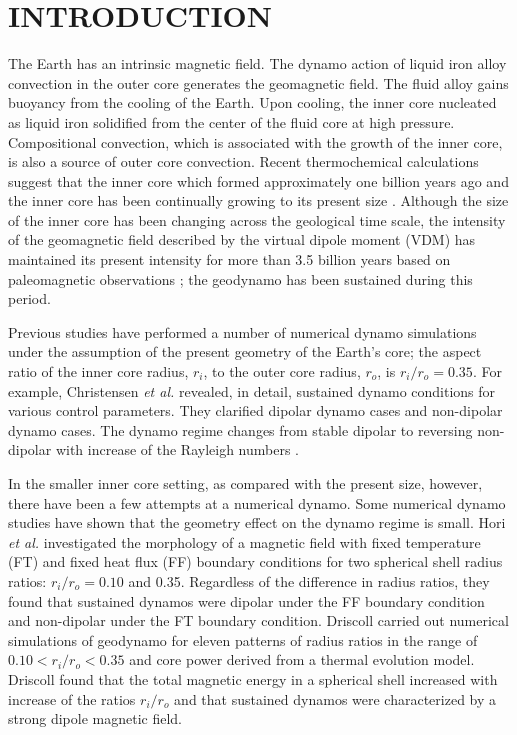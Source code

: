 \section{INTRODUCTION}
The Earth has an intrinsic magnetic field. The dynamo action of liquid iron alloy convection in the outer core generates the geomagnetic field. The fluid alloy gains buoyancy from the cooling of the Earth. Upon cooling, the inner core nucleated as liquid iron solidified from the center of the fluid core at high pressure. Compositional convection, which is associated with the growth of the inner core, is also a source of outer core convection. Recent thermochemical calculations suggest that the inner core which formed approximately one billion years ago and the inner core has been continually growing to its present size \cite{Labrosse:2001}. Although the size of the inner core has been changing across the geological time scale, the intensity of the geomagnetic field described by the virtual dipole moment (VDM) has maintained its present intensity for more than 3.5 billion years based on paleomagnetic observations \cite{Biggin:2015}; the geodynamo has been sustained during this period.

Previous studies have performed a number of numerical dynamo simulations under the assumption of the present geometry of the Earth’s core; the aspect ratio of the inner core radius, $r_{i}$, to the outer core radius, $r_{o}$, is $r_{i} / r_{o} = 0.35$.
For example, Christensen {\it et al.} \cite{Uli:2006}
revealed, in detail, sustained dynamo conditions for various control parameters. 
They clarified dipolar dynamo cases and non-dipolar dynamo cases. The dynamo regime changes from stable dipolar to reversing non-dipolar with increase of the Rayleigh numbers \cite{Kutzner:2002,Olson:2011}.

In the smaller inner core setting, as compared with the present size, however, there have been a few attempts at a numerical dynamo. 
Some numerical dynamo studies have shown that the geometry effect on the dynamo regime is small. 
Hori {\it et al.} \cite{Hori:2010} investigated the morphology of a magnetic field with fixed temperature (FT) and fixed heat flux (FF) boundary conditions for two spherical shell radius ratios:  $r_{i} / r_{o} = 0.10$ and 0.35. 
Regardless of the difference in radius ratios, they found that sustained dynamos were dipolar under the FF boundary condition and non-dipolar under the FT boundary condition. 
Driscoll  carried out numerical simulations of geodynamo for eleven patterns of radius ratios in the range of $0.10 < r_{i} / r_{o} < 0.35$ and core power derived from a thermal evolution model. 
Driscoll  found that the total magnetic energy in a spherical shell increased with increase of the ratios $r_{i} / r_{o}$ and that sustained dynamos were characterized by a strong dipole magnetic field.


